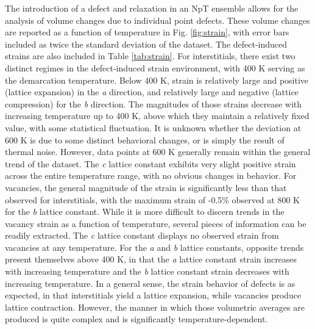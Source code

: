 \documentclass[utf8]{frontiersSCNS} %
\begin{document}
The introduction of a defect and relaxation in an NpT ensemble allows for the analysis of volume changes due to individual point defects. These volume changes are reported as a function of temperature in Fig. \ref{fig:strain}, with error bars included as twice the standard deviation of the dataset. The defect-induced strains are also included in Table \ref{tab:strain}. For interstitials, there exist two distinct regimes in the defect-induced strain environment, with 400 K serving as the demarcation temperature. Below 400 K, strain is relatively large and positive (lattice expansion) in the \textit{a} direction, and relatively large and negative (lattice compression) for the \textit{b} direction. The magnitudes of those strains decrease with increasing temperature up to 400 K, above which they maintain a relatively fixed value, with some statistical fluctuation. It is unknown whether the deviation at 600 K is due to some distinct behavioral changes, or is simply the result of thermal noise. However, data points at 600 K generally remain within the general trend of the dataset. The \textit{c} lattice constant exhibits very slight positive strain across the entire temperature range, with no obvious changes in behavior. For vacancies, the general magnitude of the strain is significantly less than that observed for interstitials, with the maximum strain of -0.5\% observed at 800 K for the \textit{b} lattice constant. While it is more difficult to discern trends in the vacancy strain as a function of temperature, several pieces of information can be readily extracted. The \textit{c} lattice constant displays no observed strain from vacancies at any temperature. For the \textit{a} and \textit{b} lattice constants, opposite trends present themselves above 400 K, in that the \textit{a} lattice constant strain increases with increasing temperature and the \textit{b} lattice constant strain decreases with increasing temperature. In a general sense, the strain behavior of defects is as expected, in that interstitials yield a lattice expansion, while vacancies produce lattice contraction. However, the manner in which those volumetric averages are produced is quite complex and is significantly temperature-dependent. 
\end{document}
